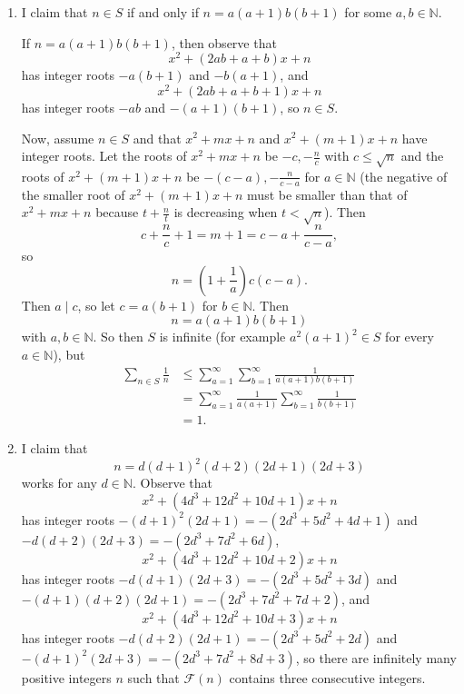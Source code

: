 \begin{enumerate}[label=(\alph*)]
	
	\item I claim that $n\in S$ if and only if $n=a\left(a+1\right)b\left(b+1\right)$ for some $a,b\in\mathbb{N}$.
	
	If $n=a\left(a+1\right)b\left(b+1\right)$, then observe that \[x^2+\left(2ab+a+b\right)x+n\] has integer roots $-a\left(b+1\right)$ and $-b\left(a+1\right)$, and \[x^2+\left(2ab+a+b+1\right)x+n\] has integer roots $-ab$ and $-\left(a+1\right)\left(b+1\right)$, so $n\in S$.
	
	Now, assume $n\in S$ and that $x^2+mx+n$ and $x^2+\left(m+1\right)x+n$ have integer roots. Let the roots of $x^2+mx+n$ be $-c,-\frac{n}{c}$ with $c\leq\sqrt{n}$ and the roots of $x^2+\left(m+1\right)x+n$ be $-\left(c-a\right),-\frac{n}{c-a}$ for $a\in\mathbb{N}$ (the negative of the smaller root of $x^2+\left(m+1\right)x+n$ must be smaller than that of $x^2+mx+n$ because $t+\frac{n}{t}$ is decreasing when $t<\sqrt{n}$). Then \[c+\frac{n}{c}+1=m+1=c-a+\frac{n}{c-a},\] so \[n=\left(1+\frac{1}{a}\right)c\left(c-a\right).\] Then $a\mid c$, so let $c=a\left(b+1\right)$ for $b\in\mathbb{N}$. Then \[n=a\left(a+1\right)b\left(b+1\right)\] with $a,b\in\mathbb{N}$. So then $S$ is infinite (for example $a^2\left(a+1\right)^2\in S$ for every $a\in\mathbb{N}$), but
	\begin{align*}
		\displaystyle\sum_{n\in S}\frac{1}{n}&\leq\displaystyle\sum_{a=1}^{\infty}\displaystyle\sum_{b=1}^{\infty}\frac{1}{a\left(a+1\right)b\left(b+1\right)}\\
		&=\displaystyle\sum_{a=1}^{\infty}\frac{1}{a\left(a+1\right)}\displaystyle\sum_{b=1}^{\infty}\frac{1}{b\left(b+1\right)}\\
		&=1.
	\end{align*}
	
	\item I claim that \[n=d\left(d+1\right)^2\left(d+2\right)\left(2d+1\right)\left(2d+3\right)\] works for any $d\in\mathbb{N}$. Observe that \[x^2+\left(4d^3+12d^2+10d+1\right)x+n\] has integer roots $-\left(d+1\right)^2\left(2d+1\right)=-\left(2d^3+5d^2+4d+1\right)$ and $-d\left(d+2\right)\left(2d+3\right)=-\left(2d^3+7d^2+6d\right)$, \[x^2+\left(4d^3+12d^2+10d+2\right)x+n\] has integer roots $-d\left(d+1\right)\left(2d+3\right)=-\left(2d^3+5d^2+3d\right)$ and $-\left(d+1\right)\left(d+2\right)\left(2d+1\right)=-\left(2d^3+7d^2+7d+2\right)$, and \[x^2+\left(4d^3+12d^2+10d+3\right)x+n\] has integer roots $-d\left(d+2\right)\left(2d+1\right)=-\left(2d^3+5d^2+2d\right)$ and $-\left(d+1\right)^2\left(2d+3\right)=-\left(2d^3+7d^2+8d+3\right)$, so there are infinitely many positive integers $n$ such that $\mathcal{F}\left(n\right)$ contains three consecutive integers.
	
\end{enumerate}